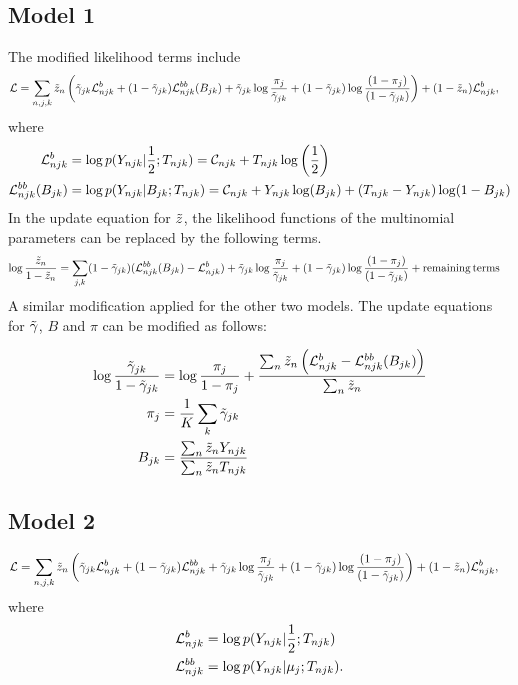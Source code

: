 \documentclass[reqno]{amsart}
\numberwithin{equation}{section}
\begin{document}
\subsection{Model 1}

The modified likelihood terms include
\begin{align}
    \mathcal{L}
        &= \sum_{n,j,k} \tilde{z}_n \left( \tilde{\gamma}_{jk} \mathcal{L}^b_{njk} + (1-\tilde{\gamma}_{jk}) \mathcal{L}^{bb}_{njk}(B_{jk})
        + \tilde{\gamma}_{jk} \log \frac{\pi_j}{\tilde{\gamma}_{jk}} + (1-\tilde{\gamma}_{jk}) \log \frac{(1-\pi_j)}{(1-\tilde{\gamma}_{jk})} \right)
        + (1-\tilde{z}_n) \mathcal{L}^b_{njk},
\end{align}
where
\begin{align}
    \mathcal{L}^b_{njk}
        &= \log p(Y_{njk} | \frac{1}{2}; T_{njk})
        = \mathcal{C}_{njk} + T_{njk} \log \left( \frac{1}{2} \right)\\
    \mathcal{L}^{bb}_{njk}(B_{jk})
        &= \log p(Y_{njk} | B_{jk}; T_{njk})
        = \mathcal{C}_{njk} + Y_{njk} \log(B_{jk}) + (T_{njk}-Y_{njk}) \log(1-B_{jk})
\end{align}
In the update equation for $\tilde{z}$, the likelihood functions of the multinomial parameters can be replaced by the following terms.
\begin{align}
    \log \frac{\tilde{z}_n}{1-\tilde{z}_n} 
        &= \sum_{j,k} (1-\tilde{\gamma}_{jk}) (\mathcal{L}^{bb}_{njk}(B_{jk}) - \mathcal{L}^b_{njk})
        + \tilde{\gamma}_{jk} \log \frac{\pi_j}{\tilde{\gamma}_{jk}} + (1-\tilde{\gamma}_{jk}) \log \frac{(1-\pi_j)}{(1-\tilde{\gamma}_{jk})}
        + \mathrm{remaining \, terms}
\end{align}
A similar modification applied for the other two models. The update equations for $\tilde{\gamma}$, $B$ and $\pi$ can be modified as follows:

\begin{align}
    \log \frac{\tilde{\gamma}_{jk}}{1-\tilde{\gamma}_{jk}}
        &= \log \frac{\pi_j}{1-\pi_j} + \frac{\sum_n \tilde{z}_n \left( \mathcal{L}^b_{njk} - \mathcal{L}^{bb}_{njk}(B_{jk}) \right)}{\sum_n \tilde{z}_n} \\
    \pi_j 
        &= \frac{1}{K} \sum_k \tilde{\gamma}_{jk} \\
    B_{jk} 
        &= \frac{\sum_n \tilde{z}_n Y_{njk}}{\sum_n \tilde{z}_n T_{njk}}
\end{align}

\subsection{Model 2}
\begin{align}
    \mathcal{L}
        &= \sum_{n,j,k} \tilde{z}_n \left( \tilde{\gamma}_{jk} \mathcal{L}^b_{njk} + (1-\tilde{\gamma}_{jk}) \mathcal{L}^{bb}_{njk}
        + \tilde{\gamma}_{jk} \log \frac{\pi_j}{\tilde{\gamma}_{jk}} + (1-\tilde{\gamma}_{jk}) \log \frac{(1-\pi_j)}{(1-\tilde{\gamma}_{jk})} \right)
        + (1-\tilde{z}_n) \mathcal{L}^b_{njk},
\end{align}
where
\begin{align}
    \mathcal{L}^b_{njk} &= \log p(Y_{njk} | \frac{1}{2}; T_{njk}) \\
    \mathcal{L}^{bb}_{njk} &= \log p(Y_{njk} | \mu_j; T_{njk}).
\end{align}
\end{document}
